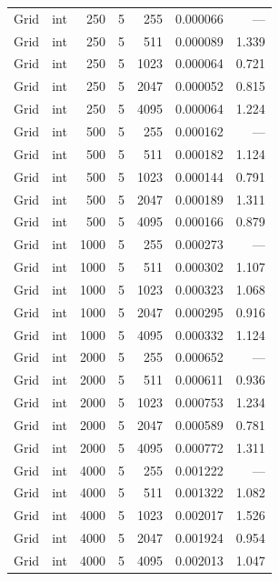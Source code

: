 \begin{longtable}{l l r r r r r}
\addlinespace
Grid & int & 250 & 5 & 255 & 0.000066 & --- \\
Grid & int & 250 & 5 & 511 & 0.000089 & 1.339 \\
Grid & int & 250 & 5 & 1023 & 0.000064 & 0.721 \\
Grid & int & 250 & 5 & 2047 & 0.000052 & 0.815 \\
Grid & int & 250 & 5 & 4095 & 0.000064 & 1.224 \\
\addlinespace
Grid & int & 500 & 5 & 255 & 0.000162 & --- \\
Grid & int & 500 & 5 & 511 & 0.000182 & 1.124 \\
Grid & int & 500 & 5 & 1023 & 0.000144 & 0.791 \\
Grid & int & 500 & 5 & 2047 & 0.000189 & 1.311 \\
Grid & int & 500 & 5 & 4095 & 0.000166 & 0.879 \\
\addlinespace
Grid & int & 1000 & 5 & 255 & 0.000273 & --- \\
Grid & int & 1000 & 5 & 511 & 0.000302 & 1.107 \\
Grid & int & 1000 & 5 & 1023 & 0.000323 & 1.068 \\
Grid & int & 1000 & 5 & 2047 & 0.000295 & 0.916 \\
Grid & int & 1000 & 5 & 4095 & 0.000332 & 1.124 \\
\addlinespace
Grid & int & 2000 & 5 & 255 & 0.000652 & --- \\
Grid & int & 2000 & 5 & 511 & 0.000611 & 0.936 \\
Grid & int & 2000 & 5 & 1023 & 0.000753 & 1.234 \\
Grid & int & 2000 & 5 & 2047 & 0.000589 & 0.781 \\
Grid & int & 2000 & 5 & 4095 & 0.000772 & 1.311 \\
\addlinespace
Grid & int & 4000 & 5 & 255 & 0.001222 & --- \\
Grid & int & 4000 & 5 & 511 & 0.001322 & 1.082 \\
Grid & int & 4000 & 5 & 1023 & 0.002017 & 1.526 \\
Grid & int & 4000 & 5 & 2047 & 0.001924 & 0.954 \\
Grid & int & 4000 & 5 & 4095 & 0.002013 & 1.047 \\
\end{longtable}
